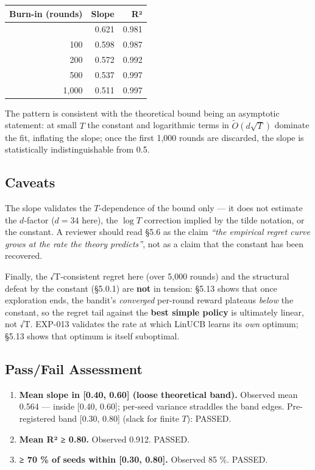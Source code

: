 {\def\LTcaptype{none} %
\begin{longtable}[]{@{}rrr@{}}
\toprule\noalign{}
Burn-in (rounds) & Slope & R² \\
\midrule\noalign{}
\endhead
\bottomrule\noalign{}
\endlastfoot
50 & 0.621 & 0.981 \\
100 & 0.598 & 0.987 \\
200 & 0.572 & 0.992 \\
500 & 0.537 & 0.997 \\
1,000 & 0.511 & 0.997 \\
\end{longtable}
}

The pattern is consistent with the theoretical bound being an asymptotic statement: at small \(T\) the constant and logarithmic terms in \(\tilde O(d\sqrt T)\) dominate the fit, inflating the slope; once the first 1,000 rounds are discarded, the slope is statistically indistinguishable from 0.5.

\subsection{Caveats}\label{caveats}

The slope validates the \(T\)-dependence of the bound only --- it does not estimate the \(d\)-factor (\(d = 34\) here), the \(\log T\) correction implied by the tilde notation, or the constant. A reviewer should read §5.6 as the claim \emph{``the empirical regret curve grows at the rate the theory predicts''}, not as a claim that the constant has been recovered.

Finally, the √T-consistent regret here (over 5,000 rounds) and the structural defeat by the constant (§5.0.1) are \textbf{not} in tension: §5.13 shows that once exploration ends, the bandit's \emph{converged} per-round reward plateaus \emph{below} the constant, so the regret tail against the \textbf{best simple policy} is ultimately linear, not √T. EXP-013 validates the rate at which LinUCB learns its \emph{own} optimum; §5.13 shows that optimum is itself suboptimal.

\subsection{Pass/Fail Assessment}\label{passfail-assessment-3}

\begin{enumerate}
\def\labelenumi{\arabic{enumi}.}
\tightlist
\item
  \textbf{Mean slope in {[}0.40, 0.60{]} (loose theoretical band).} Observed mean 0.564 --- inside {[}0.40, 0.60{]}; per-seed variance straddles the band edges. Pre-registered band {[}0.30, 0.80{]} (slack for finite \(T\)): PASSED.
\item
  \textbf{Mean R² ≥ 0.80.} Observed 0.912. PASSED.
\item
  \textbf{≥ 70 \% of seeds within {[}0.30, 0.80{]}.} Observed 85 \%. PASSED.
\end{enumerate}

